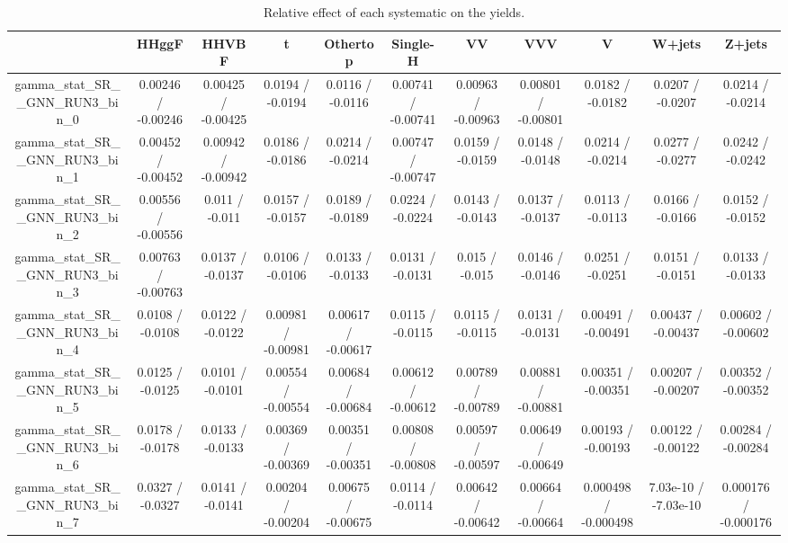 \documentclass[10pt]{article}
\begin{document}
\begin{table}[htbp]
\begin{center}
\begin{tabular}{|c|c|c|c|c|c|c|c|c|c|c|}
\hline 
      & HHggF      & HHVBF      & t      & Othertop      & Single-H      & VV      & VVV      & V      & W+jets      & Z+jets \\ 
\hline 
  gamma_stat_SR__GNN_RUN3_bin_0 & 0.00246 / -0.00246 & 0.00425 / -0.00425 & 0.0194 / -0.0194 & 0.0116 / -0.0116 & 0.00741 / -0.00741 & 0.00963 / -0.00963 & 0.00801 / -0.00801 & 0.0182 / -0.0182 & 0.0207 / -0.0207 & 0.0214 / -0.0214 \\ 
  gamma_stat_SR__GNN_RUN3_bin_1 & 0.00452 / -0.00452 & 0.00942 / -0.00942 & 0.0186 / -0.0186 & 0.0214 / -0.0214 & 0.00747 / -0.00747 & 0.0159 / -0.0159 & 0.0148 / -0.0148 & 0.0214 / -0.0214 & 0.0277 / -0.0277 & 0.0242 / -0.0242 \\ 
  gamma_stat_SR__GNN_RUN3_bin_2 & 0.00556 / -0.00556 & 0.011 / -0.011 & 0.0157 / -0.0157 & 0.0189 / -0.0189 & 0.0224 / -0.0224 & 0.0143 / -0.0143 & 0.0137 / -0.0137 & 0.0113 / -0.0113 & 0.0166 / -0.0166 & 0.0152 / -0.0152 \\ 
  gamma_stat_SR__GNN_RUN3_bin_3 & 0.00763 / -0.00763 & 0.0137 / -0.0137 & 0.0106 / -0.0106 & 0.0133 / -0.0133 & 0.0131 / -0.0131 & 0.015 / -0.015 & 0.0146 / -0.0146 & 0.0251 / -0.0251 & 0.0151 / -0.0151 & 0.0133 / -0.0133 \\ 
  gamma_stat_SR__GNN_RUN3_bin_4 & 0.0108 / -0.0108 & 0.0122 / -0.0122 & 0.00981 / -0.00981 & 0.00617 / -0.00617 & 0.0115 / -0.0115 & 0.0115 / -0.0115 & 0.0131 / -0.0131 & 0.00491 / -0.00491 & 0.00437 / -0.00437 & 0.00602 / -0.00602 \\ 
  gamma_stat_SR__GNN_RUN3_bin_5 & 0.0125 / -0.0125 & 0.0101 / -0.0101 & 0.00554 / -0.00554 & 0.00684 / -0.00684 & 0.00612 / -0.00612 & 0.00789 / -0.00789 & 0.00881 / -0.00881 & 0.00351 / -0.00351 & 0.00207 / -0.00207 & 0.00352 / -0.00352 \\ 
  gamma_stat_SR__GNN_RUN3_bin_6 & 0.0178 / -0.0178 & 0.0133 / -0.0133 & 0.00369 / -0.00369 & 0.00351 / -0.00351 & 0.00808 / -0.00808 & 0.00597 / -0.00597 & 0.00649 / -0.00649 & 0.00193 / -0.00193 & 0.00122 / -0.00122 & 0.00284 / -0.00284 \\ 
  gamma_stat_SR__GNN_RUN3_bin_7 & 0.0327 / -0.0327 & 0.0141 / -0.0141 & 0.00204 / -0.00204 & 0.00675 / -0.00675 & 0.0114 / -0.0114 & 0.00642 / -0.00642 & 0.00664 / -0.00664 & 0.000498 / -0.000498 & 7.03e-10 / -7.03e-10 & 0.000176 / -0.000176 \\ 
\hline 
\end{tabular} 
\caption{Relative effect of each systematic on the yields.} 
\end{center} 
\end{table} 
\end{document}
